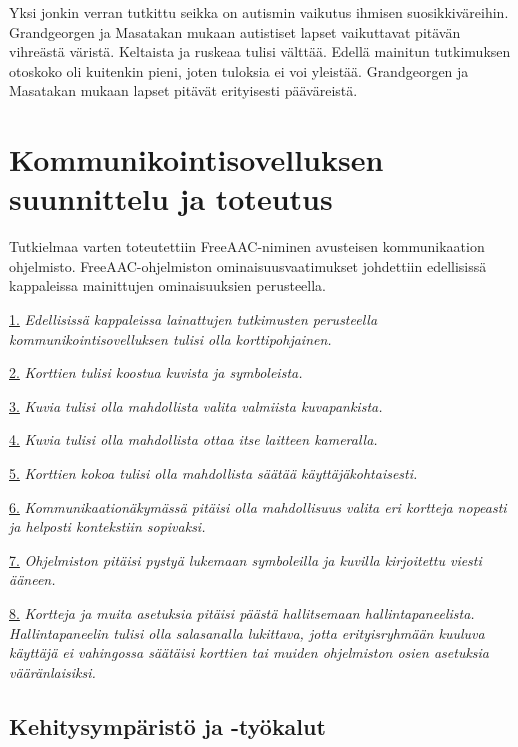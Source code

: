 \documentclass[utf8]{gradu3}
\begin{document}
\label{AAC-colors}
Yksi jonkin verran tutkittu seikka on autismin vaikutus ihmisen suosikkiväreihin. Grandgeorgen ja Masatakan \parencite[]{color-preference-autism} mukaan autistiset lapset vaikuttavat pitävän vihreästä väristä. Keltaista ja ruskeaa tulisi välttää. Edellä mainitun tutkimuksen otoskoko oli kuitenkin pieni, joten tuloksia ei voi yleistää. Grandgeorgen ja Masatakan mukaan lapset pitävät erityisesti pääväreistä.

\chapter{Kommunikointisovelluksen suunnittelu ja toteutus}

Tutkielmaa varten toteutettiin FreeAAC-niminen avusteisen kommunikaation ohjelmisto. FreeAAC-ohjelmiston ominaisuusvaatimukset johdettiin edellisissä kappaleissa mainittujen ominaisuuksien perusteella.

\hyperref[AAC-cards]{1.} \textit{Edellisissä kappaleissa lainattujen tutkimusten perusteella kommunikointisovelluksen tulisi olla korttipohjainen.}

\hyperref[AAC-symbols]{2.} \textit{Korttien tulisi koostua kuvista ja symboleista. }

\hyperref[symbol-libraries]{3.} \textit{Kuvia tulisi olla mahdollista valita valmiista kuvapankista.}

\hyperref[AAC-photos]{4.} \textit{Kuvia tulisi olla mahdollista ottaa itse laitteen kameralla.}

\hyperref[AAC-cardsize]{5.} \textit{Korttien kokoa tulisi olla mahdollista säätää käyttäjäkohtaisesti.}

\hyperref[AAC-cardsize]{6.} \textit{Kommunikaationäkymässä pitäisi olla mahdollisuus valita eri kortteja nopeasti ja helposti kontekstiin sopivaksi.}

\hyperref[AAC-soundsynth]{7.} \textit{Ohjelmiston pitäisi pystyä lukemaan symboleilla ja kuvilla kirjoitettu viesti ääneen.}

\hyperref[AAC-settings]{8.} \textit{Kortteja ja muita asetuksia pitäisi päästä hallitsemaan hallintapaneelista. Hallintapaneelin tulisi olla salasanalla lukittava, jotta erityisryhmään kuuluva käyttäjä ei vahingossa säätäisi korttien tai muiden ohjelmiston osien asetuksia vääränlaisiksi.}

\section{Kehitysympäristö ja -työkalut}
\end{document}
